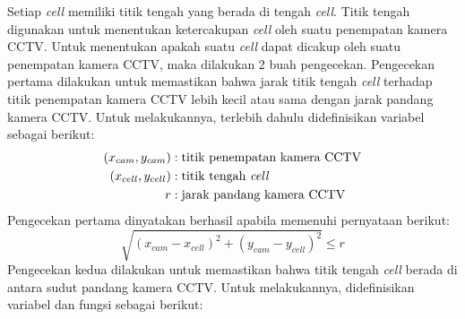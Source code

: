 Setiap \textit{cell} memiliki titik tengah yang berada di tengah \textit{cell}. Titik tengah digunakan untuk menentukan ketercakupan \textit{cell} oleh suatu penempatan kamera CCTV. Untuk menentukan apakah suatu \textit{cell} dapat dicakup oleh suatu penempatan kamera CCTV, maka dilakukan 2 buah pengecekan. Pengecekan pertama dilakukan untuk memastikan bahwa jarak titik tengah \textit{cell} terhadap titik penempatan kamera CCTV lebih kecil atau sama dengan jarak pandang kamera CCTV. Untuk melakukannya, terlebih dahulu didefinisikan variabel sebagai berikut:
\begin{equation}
	\begin{split}
		(x_{cam},y_{cam}) &: \text{titik penempatan kamera CCTV}\\
		(x_{cell},y_{cell}) &: \text{titik tengah \textit{cell}}\\
		r &: \text{jarak pandang kamera CCTV}
	\end{split}
\end{equation}
Pengecekan pertama dinyatakan berhasil apabila memenuhi pernyataan berikut:
\begin{equation}
	\sqrt{(x_{cam} - x_{cell})^2 + (y_{cam} - y_{cell})^2} \leq r
\end{equation}
Pengecekan kedua dilakukan untuk memastikan bahwa titik tengah \textit{cell} berada di antara sudut pandang kamera CCTV. Untuk melakukannya, didefinisikan variabel dan fungsi sebagai berikut:
